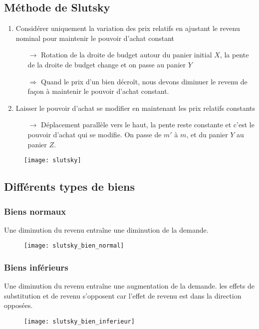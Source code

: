 \newpage
\subsection{Méthode de Slutsky}

\begin{enumerate}
\item Considérer uniquement la variation des prix relatifs en ajustant le revenu nominal pour maintenir le pouvoir d'achat constant
	\begin{itemize}
	\item[$\rightarrow$] Rotation de la droite de budget autour du panier initial $X$, la pente de la droite de budget change et on passe au panier $Y$
	\item[$\Rightarrow$] Quand le prix d'un bien décroît, nous devons diminuer le revenu de façon à maintenir le pouvoir d'achat constant.
	\end{itemize}
\item Laisser le pouvoir d'achat se modifier en maintenant les prix relatifs constants
	\begin{itemize}
	\item[$\rightarrow$] Déplacement parallèle vers le haut, la pente reste constante et c'est le pouvoir d'achat qui se modifie. On passe de $m'$ à $m$, et du panier $Y$ au panier $Z$.
	\end{itemize}
\end{enumerate}

\begin{figure}[H]
	\centering
	\texttt{[image: slutsky]}
\end{figure}


\subsection{Différents types de biens}

\subsubsection{Biens normaux}
Une diminution du revenu entraîne une diminution de la demande.
\begin{figure}[H]
	\centering
	\texttt{[image: slutsky\_bien\_normal]}
\end{figure}

\subsubsection{Biens inférieurs}
Une diminution du revenu entraîne une augmentation de la demande. les effets de substitution et de revenu s'opposent car l'effet de revenu est dans la direction opposées.
\begin{figure}[H]
	\centering
	\texttt{[image: slutsky\_bien\_inferieur]}
\end{figure}

